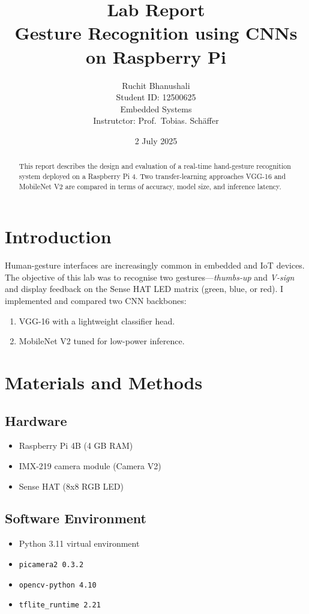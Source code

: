\documentclass[a4paper,12pt]{article}
\title{\textbf{Lab Report}\\Gesture Recognition using CNNs on Raspberry Pi}
\author{Ruchit Bhanushali\\Student ID: 12500625\\Embedded Systems\\Instrutctor: Prof.~Tobias. Schäffer}
\date{2 July 2025}
\begin{document}
\maketitle

\begin{abstract}
This report describes the design and evaluation of a real-time hand-gesture recognition system deployed on a Raspberry Pi 4. 
Two transfer-learning approaches VGG-16 and MobileNet V2 are compared in terms of accuracy, model size, and inference latency.
\end{abstract}

\section{Introduction}
Human-gesture interfaces are increasingly common in embedded and IoT devices. The objective of this lab was to recognise two gestures—\emph{thumbs-up} and \emph{V-sign} and display feedback on the Sense HAT LED matrix (green, blue, or red). I implemented and compared two CNN backbones:
\begin{enumerate}
\item VGG-16 with a lightweight classifier head.
\item MobileNet V2 tuned for low-power inference.
\end{enumerate}

\section{Materials and Methods}
\subsection{Hardware}
\begin{itemize}
\item Raspberry Pi 4B (4 GB RAM)
\item IMX-219 camera module (Camera V2)
\item Sense HAT (8x8 RGB LED)
\end{itemize}

\subsection{Software Environment}
\begin{itemize}
\item Python 3.11 virtual environment
\item \texttt{picamera2 0.3.2}
\item \texttt{opencv-python 4.10}
\item \texttt{tflite\_runtime 2.21}
\end{itemize}
\end{document}
